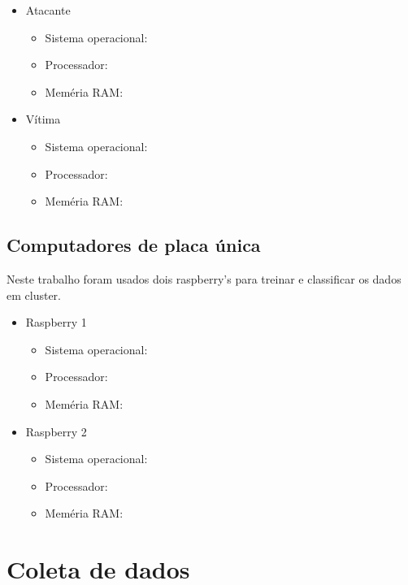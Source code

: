 \begin{itemize}
    \item Atacante
        \begin{itemize}
            \item Sistema operacional:
            \item Processador: 
            \item Meméria RAM: 
        \end{itemize}
    \item Vítima
        \begin{itemize}
            \item Sistema operacional: 
            \item Processador: 
            \item Meméria RAM: 
        \end{itemize}        
\end{itemize}



\subsection{Computadores de placa única}

Neste trabalho foram usados dois raspberry's para treinar e classificar 
os dados em cluster. 

\begin{itemize}
    \item Raspberry 1
        \begin{itemize}
            \item Sistema operacional: 
            \item Processador: 
            \item Meméria RAM: 
        \end{itemize}
    \item Raspberry 2
        \begin{itemize}
            \item Sistema operacional: 
            \item Processador: 
            \item Meméria RAM: 
        \end{itemize}        
\end{itemize}

\section{Coleta de dados}

